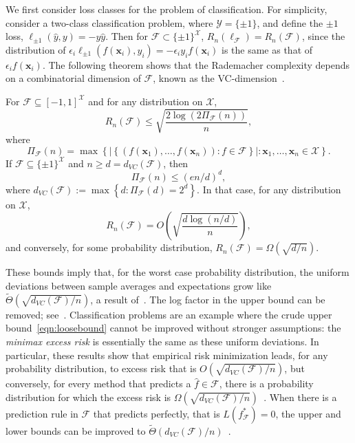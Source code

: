 We first consider loss classes for the problem of classification. For simplicity, consider a two-class classification problem, where
${\mathcal Y}=\{\pm 1\}$, and define the $\pm 1$ loss, $\ell_{\pm
1}(\widehat y,y) = - y\widehat y$. Then for ${\mathcal F}\subset\{\pm 1\}^{{\mathcal X}}$,
$R_n(\ell_{{\mathcal F}})= R_n({\mathcal F})$, since the distribution of $\epsilon_i\ell_{\pm
1}(f({\boldsymbol x}_i),y_i)=-\epsilon_iy_if({\boldsymbol x}_i)$ is the same as that of
$\epsilon_if({\boldsymbol x}_i)$. The following theorem shows that the Rademacher complexity depends on a combinatorial dimension of ${\mathcal F}$, known as the VC-dimension~\cite{vc71}.

\begin{theorem}\label{thm:vcdim}
For ${\mathcal F}\subseteq[-1,1]^{{\mathcal X}}$ and for any distribution on ${\mathcal X}$,
  \[
    R_n({\mathcal F}) \le \sqrt{\frac{2\log(2 \Pi_{{\mathcal F}}(n))}{n}},
  \]
where
  \[
    \Pi_{{\mathcal F}}(n) = \max\left\{\left|\left\{(f({\boldsymbol x}_1),\ldots,f({\boldsymbol x}_n)):f\in {\mathcal F}
    \right\}\right|:{\boldsymbol x}_1,\ldots,{\boldsymbol x}_n\in{\mathcal X}\right\}.
  \]
If ${\mathcal F}\subseteq\{\pm 1\}^{{\mathcal X}}$ and
$n\ge d=d_{VC}({\mathcal F})$, then $$ \Pi_{{\mathcal F}}(n) \le \left(en/d\right)^d,$$
where $d_{VC}({\mathcal F}) := \max\left\{d: \Pi_{{\mathcal F}}(d)=2^d\right\}$.
In that case, for any distribution on ${\mathcal X}$,
  \[
    R_n({\mathcal F})=O\left( \sqrt{\frac{d\log(n/d)}{n}}\right),
  \]
and conversely, for some probability distribution,
$R_n({\mathcal F}) =\Omega\left(\sqrt{d/n}\right)$.
\end{theorem}

These bounds imply that, for the worst case probability distribution, the uniform deviations between sample averages and expectations grow like $\tilde\Theta(\sqrt{d_{VC}({\mathcal F})/n})$, a result of~\cite{vc71}. The log factor in the upper bound can be removed; see~\cite{t-sbgep-94}.  Classification problems are an example where the crude upper bound~\eqref{eqn:loosebound}
cannot be improved without stronger assumptions: the {\em
minimax excess risk} is essentially the same as these uniform deviations. In particular, these results show that empirical risk minimization leads, for any probability distribution, to excess risk that is $O(\sqrt{d_{VC}({\mathcal F})/n})$, but conversely, for every method that predicts a $\widehat f\in {\mathcal F}$, there is a probability distribution for which the excess risk is
$\Omega(\sqrt{d_{VC}({\mathcal F})/n})$~\cite{vc-tpr-74}.  When there is a prediction rule in ${\mathcal F}$ that predicts perfectly, that is
$L(f_{{\mathcal F}}^*)=0$, the upper and lower bounds can be improved to $\tilde\Theta(d_{VC}({\mathcal F})/n)$~\cite{behw-lvd-89,ehkv-glbnenl-89}.


